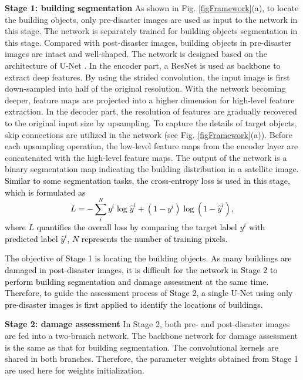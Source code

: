 \documentclass[journal]{IEEEtran}
\begin{document}
\textbf{Stage 1: building segmentation} As shown in Fig. \ref{figFramework}(a), to locate the building objects, only pre-disaster images are used as input to the network in this stage. The network is separately trained for building objects segmentation in this stage. Compared with post-disaster images, building objects in pre-disaster images are intact and well-shaped. The network is designed based on the architecture of U-Net \cite{UNet}. In the encoder part, a ResNet \cite{he2016deep} is used as backbone to extract deep features. 
By using the strided convolution, the input image is first down-sampled into half of the original resolution. With the network becoming deeper, feature maps are projected into a higher dimension for high-level feature extraction. In the decoder part, the resolution of features are gradually recovered to the original input size by upsampling. To capture the details of target objects, skip connections are utilized in the network (see Fig. \ref{figFramework}(a)). Before each upsampling operation, the low-level feature maps from the encoder layer are concatenated with the high-level feature maps. The output of the network is a binary segmentation map indicating the building distribution in a satellite image. \textcolor{black}{Similar to some segmentation tasks, the cross-entropy loss is used in this stage, which is formulated as  
\begin{equation}
	L = -\sum_i^N{y^i\log\hat{y}^i + (1-y^i)\log(1-\hat{y}^i)},
	\label{eqCEL}
\end{equation}
where $L$ quantifies the overall loss by comparing the target label $y^i$ with predicted label $\hat{y}^i$, $N$ represents the number of training pixels.}

\textcolor{black}{The objective of Stage 1 is locating the building objects. 
As many buildings are damaged in post-disaster images, it is difficult for the network in Stage 2 to perform building segmentation and damage assessment at the same time. 
 Therefore, to guide the assessment process of Stage 2, a single U-Net using only pre-disaster images is first applied to identify the locations of  buildings. }

\textbf{Stage 2: damage assessment} In Stage 2, both pre- and post-disaster images are fed into a two-branch network.
The backbone network for damage assessment is the same as that for building segmentation. The convolutional kernels are shared in both branches. Therefore, the parameter weights obtained from Stage 1 are used here for weights initialization.  
\end{document}
